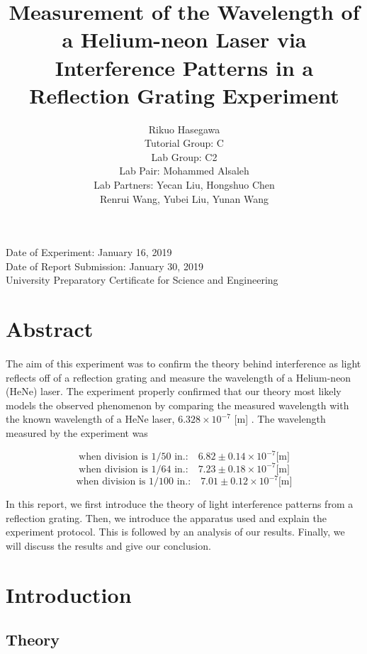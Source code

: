 \documentclass{article}
\title{Measurement of the Wavelength of a Helium-neon Laser via Interference Patterns in a Reflection Grating Experiment}
\author{ Rikuo Hasegawa
  \\ Tutorial Group: C
  \\ Lab Group: C2
  \\ Lab Pair: Mohammed Alsaleh
  \\ Lab Partners: Yecan Liu, Hongshuo Chen \\ Renrui Wang, Yubei Liu, Yunan Wang }
\begin{document}
\maketitle
\thispagestyle{fancy}
\vspace*{\fill}
\parbox{\linewidth}{\centering%
Date of Experiment: January 16, 2019
\\ Date of Report Submission: January 30, 2019
\\ University Preparatory Certificate for Science and Engineering
}
\newpage

\section*{Abstract}
\paragraph{}
The aim of this experiment was to confirm the theory behind interference as light reflects off of a reflection grating and measure the wavelength of a Helium-neon (HeNe) laser. The experiment properly confirmed that our theory most likely models the observed phenomenon by comparing the measured wavelength with the known wavelength of a HeNe laser, $6.328 \times 10^{-7}$ [m] \autocite{WikiHeNe}. The wavelength measured by the experiment was

$$
\text{when division is 1/50  in.:} \quad  6.82 \pm 0.14 \times 10^{-7} \text{[m]}
$$
$$
\text{when division is 1/64  in.:} \quad 7.23 \pm 0.18 \times 10^{-7} \text{[m]}
$$
$$
\text{when division is 1/100  in.:} \quad 7.01 \pm 0.12 \times 10^{-7} \text{[m]}
$$

In this report, we first introduce the theory of light interference patterns from a reflection grating. Then, we introduce the apparatus used and explain the experiment protocol. This is followed by an analysis of our results. Finally, we will discuss the results and give our conclusion.

\section{Introduction}

\subsection{Theory}
\end{document}
